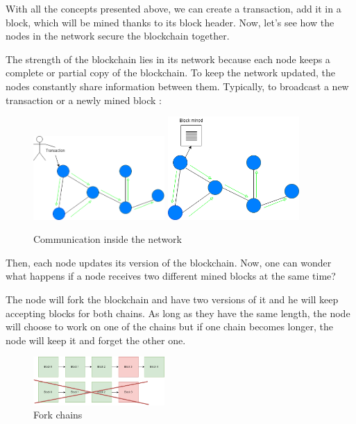   With all the concepts presented above, we can create a transaction, add it in a block, which will be mined thanks to its block header. Now, let's see how the nodes in the network secure the blockchain together. \newline

  The strength of the blockchain lies in its network because each node keeps a complete or partial copy of the blockchain. To keep the network updated, the nodes constantly share information between them. Typically, to broadcast a new transaction or a newly mined block :

  \begin{figure}[ht]
  \centering
  \includegraphics[width=5cm]{Figures/networkTransaction}
  \hspace{1cm}
  \includegraphics[width=5cm]{Figures/networkBlock}
  \caption{Communication inside the network}
  \end{figure}

  Then, each node updates its version of the blockchain. Now, one can wonder what happens if a node receives two different mined blocks at the same time?

  The node will fork the blockchain and have two versions of it and he will keep accepting blocks for both chains. As long as they have the same length, the node will choose to work on one of the chains but if one chain becomes longer, the node will keep it and forget the other one.

  \begin{figure}[ht]
  \centering
  \includegraphics[width=5cm]{Figures/forkChains}
  \caption{Fork chains}
  \end{figure}

